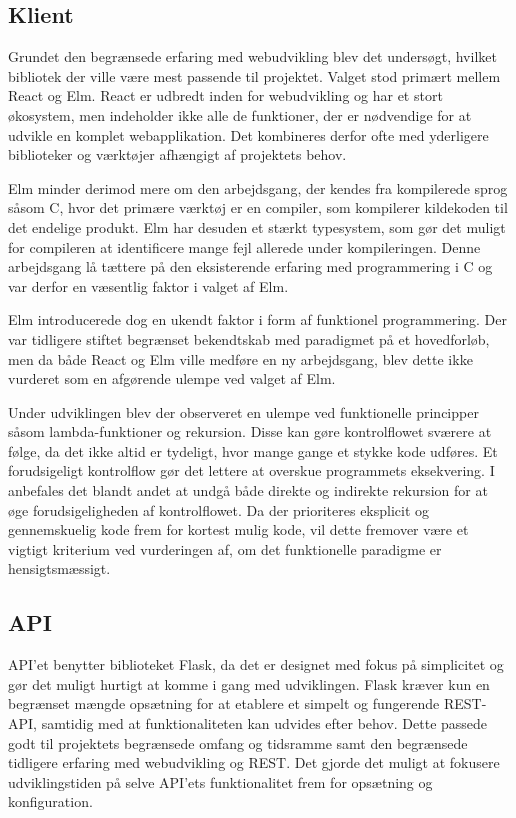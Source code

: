 \documentclass[a4paper, 11pt]{article}
\begin{document}
\subsection{Klient}
\label{sec:klient}

Grundet den begrænsede erfaring med webudvikling blev det undersøgt, hvilket bibliotek der
ville være mest passende til projektet. Valget stod primært mellem React og Elm. React er
udbredt inden for webudvikling og har et stort økosystem, men indeholder ikke alle de
funktioner, der er nødvendige for at udvikle en komplet webapplikation. Det kombineres derfor
ofte med yderligere biblioteker og værktøjer afhængigt af projektets behov.

Elm minder derimod mere om den arbejdsgang, der kendes fra kompilerede sprog såsom C, hvor
det primære værktøj er en compiler, som kompilerer kildekoden til det endelige produkt. Elm
har desuden et stærkt typesystem, som gør det muligt for compileren at identificere mange
fejl allerede under kompileringen. Denne arbejdsgang lå tættere på den eksisterende erfaring
med programmering i C og var derfor en væsentlig faktor i valget af Elm.

Elm introducerede dog en ukendt faktor i form af funktionel programmering. Der var tidligere
stiftet begrænset bekendtskab med paradigmet på et hovedforløb, men da både React og Elm
ville medføre en ny arbejdsgang, blev dette ikke vurderet som en afgørende ulempe ved valget
af Elm.

Under udviklingen blev der observeret en ulempe ved funktionelle principper såsom
lambda-funktioner og rekursion. Disse kan gøre kontrolflowet sværere at følge, da det ikke
altid er tydeligt, hvor mange gange et stykke kode udføres. Et forudsigeligt kontrolflow gør
det lettere at overskue programmets eksekvering. I~\cite{holzmann_power_of_ten} anbefales det
blandt andet at undgå både direkte og indirekte rekursion for at øge forudsigeligheden af
kontrolflowet. Da der prioriteres eksplicit og gennemskuelig kode frem for kortest mulig
kode, vil dette fremover være et vigtigt kriterium ved vurderingen af, om det funktionelle
paradigme er hensigtsmæssigt.

\subsection{API}

API'et benytter biblioteket Flask, da det er designet med fokus på simplicitet og gør det
muligt hurtigt at komme i gang med udviklingen. Flask kræver kun en begrænset mængde
opsætning for at etablere et simpelt og fungerende REST-API, samtidig med at funktionaliteten
kan udvides efter behov. Dette passede godt til projektets begrænsede omfang og tidsramme
samt den begrænsede tidligere erfaring med webudvikling og REST. Det gjorde det muligt at
fokusere udviklingstiden på selve API'ets funktionalitet frem for opsætning og konfiguration.
\end{document}
